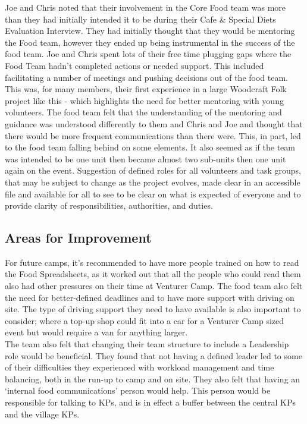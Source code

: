 Joe and Chris noted that their involvement in the Core Food team was more than they had initially intended it to be during their Cafe \& Special Diets Evaluation Interview. They had initially thought that they would be mentoring the Food team, however they ended up being instrumental in the success of the food team. Joe and Chris spent lots of their free time plugging gaps where the Food Team hadn't completed actions or needed support. This included facilitating a number of meetings and pushing decisions out of the food team. This was, for many members, their first experience in a large Woodcraft Folk project like this - which highlights the need for better mentoring with young volunteers.  The food team felt that the understanding of the mentoring and guidance was understood differently to them and Chris and Joe and thought that there would be more frequent communications than there were.  This, in part, led to the food team falling behind on some elements.  It also seemed as if the team was intended to be one unit then became almost two sub-units then one unit again on the event. Suggestion of defined roles for all volunteers and task groups, that may be subject to change as the project evolves, made clear in an accessible file and available for all to see to be clear on what is expected of everyone and to provide clarity of responsibilities, authorities, and duties.
\subsection{Areas for Improvement}
For future camps, it's recommended to have more people trained on how to read the Food Spreadsheets, as it worked out that all the people who could read them also had other pressures on their time at Venturer Camp. The food team also felt the need for better-defined deadlines and to have more support with driving on site. The type of driving support they need to have available is also important to consider; where a top-up shop could fit into a car for a Venturer Camp sized event but would require a van for anything larger. \\

The team also felt that changing their team structure to include a Leadership role would be beneficial. They found that not having a defined leader led to some of their difficulties they experienced with workload management and time balancing, both in the run-up to camp and on site. They also felt that having an `internal food communications' person would help. This person would be responsible for talking to KPs, and is in effect a buffer between the central KPs and the village KPs. \\

